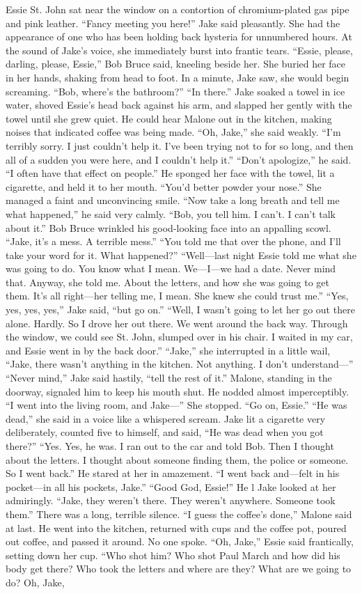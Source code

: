 \documentclass{novel}
\begin{document}
Essie St. John sat near the window on a contortion of chromium-plated gas pipe and pink leather. “Fancy meeting you here!” Jake said pleasantly. She had the appearance of one who has been holding back hysteria for unnumbered hours. At the sound of Jake’s voice, she immediately burst into frantic tears. “Essie, please, darling, please, Essie,” Bob Bruce said, kneeling beside her. She buried her face in her hands, shaking from head to foot. In a minute, Jake saw, she would begin screaming. “Bob, where’s the bathroom?” “In there.” Jake soaked a towel in ice water, shoved Essie’s head back against his arm, and slapped her gently with the towel until she grew quiet. He could hear Malone out in the kitchen, making noises that indicated coffee was being made. “Oh, Jake,” she said weakly. “I’m terribly sorry. I just couldn’t help it. I’ve been trying not to for so long, and then all of a sudden you were here, and I couldn’t help it.” “Don’t apologize,” he said. “I often have that effect on people.” He sponged her face with the towel, lit a cigarette, and held it to her mouth. “You’d better powder your nose.” She managed a faint and unconvincing smile. “Now take a long breath and tell me what happened,” he said very calmly. “Bob, you tell him. I can’t. I can’t talk about it.” Bob Bruce wrinkled his good-looking face into an appalling scowl. “Jake, it’s a mess. A terrible mess.” “You told me that over the phone, and I’ll take your word for it. What happened?” “Well—last night Essie told me what she was going to do. You know what I mean. We—I—we had a date. Never mind that. Anyway, she told me. About the letters, and how she was going to get them. It’s all right—her telling me, I mean. She knew she could trust me.” “Yes, yes, yes, yes,” Jake said, “but go on.” “Well, I wasn’t going to let her go out there alone. Hardly. So I drove her out there. We went around the back way. Through the window, we could see St. John, slumped over in his chair. I waited in my car, and Essie went in by the back door.” “Jake,” she interrupted in a little wail, “Jake, there wasn’t anything in the kitchen. Not anything. I don’t understand—” “Never mind,” Jake said hastily, “tell the rest of it.” Malone, standing in the doorway, signaled him to keep his mouth shut. He nodded almost imperceptibly. “I went into the living room, and Jake—” She stopped. “Go on, Essie.” “He was dead,” she said in a voice like a whispered scream. Jake lit a cigarette very deliberately, counted five to himself, and said, “He was dead when you got there?” “Yes. Yes, he was. I ran out to the car and told Bob. Then I thought about the letters. I thought about someone finding them, the police or someone. So I went back.” He stared at her in amazement. “I went back and—felt in his pocket—in all his pockets, Jake.” “Good God, Essie!” He l Jake looked at her admiringly. “Jake, they weren’t there. They weren’t anywhere. Someone took them.” There was a long, terrible silence. “I guess the coffee’s done,” Malone said at last. He went into the kitchen, returned with cups and the coffee pot, poured out coffee, and passed it around. No one spoke. “Oh, Jake,” Essie said frantically, setting down her cup. “Who shot him? Who shot Paul March and how did his body get there? Who took the letters and where are they? What are we going to do? Oh, Jake, 
\end{document}

